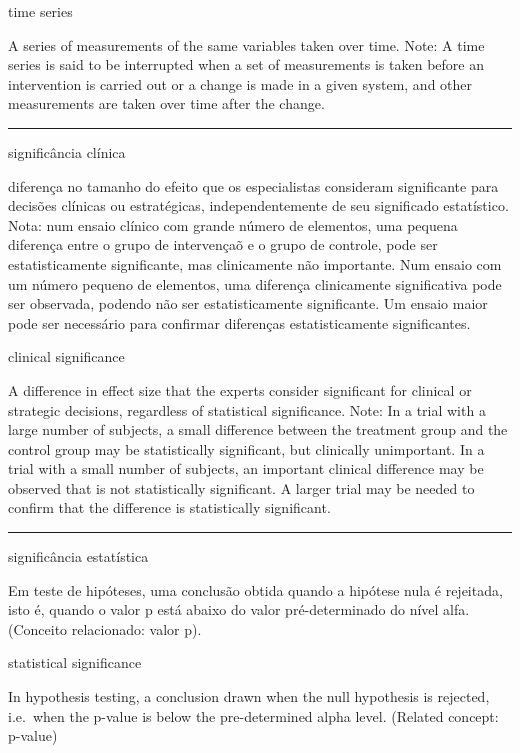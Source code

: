 \documentclass[
  openany]{book}
\begin{document}
time series

A series of measurements of the same variables taken over time. Note: A time series is said to be interrupted when a set of measurements is taken before an intervention is carried out or a change is made in a given system, and other measurements are taken over time after the change.

\begin{center}\rule{0.5\linewidth}{0.5pt}\end{center}

significância clínica

diferença no tamanho do efeito que os especialistas consideram significante para decisões clínicas ou estratégicas, independentemente de seu significado estatístico. Nota: num ensaio clínico com grande número de elementos, uma pequena diferença entre o grupo de intervençaõ e o grupo de controle, pode ser estatisticamente significante, mas clinicamente não importante. Num ensaio com um número pequeno de elementos, uma diferença clinicamente significativa pode ser observada, podendo não ser estatisticamente significante. Um ensaio maior pode ser necessário para confirmar diferenças estatisticamente significantes.

clinical significance

A difference in effect size that the experts consider significant for clinical or strategic decisions, regardless of statistical significance. Note: In a trial with a large number of subjects, a small difference between the treatment group and the control group may be statistically significant, but clinically unimportant. In a trial with a small number of subjects, an important clinical difference may be observed that is not statistically significant. A larger trial may be needed to confirm that the difference is statistically significant.

\begin{center}\rule{0.5\linewidth}{0.5pt}\end{center}

significância estatística

Em teste de hipóteses, uma conclusão obtida quando a hipótese nula é rejeitada, isto é, quando o valor p está abaixo do valor pré-determinado do nível alfa. (Conceito relacionado: valor p).

statistical significance

In hypothesis testing, a conclusion drawn when the null hypothesis is rejected, i.e.~when the p-value is below the pre-determined alpha level. (Related concept: p-value)
\end{document}
